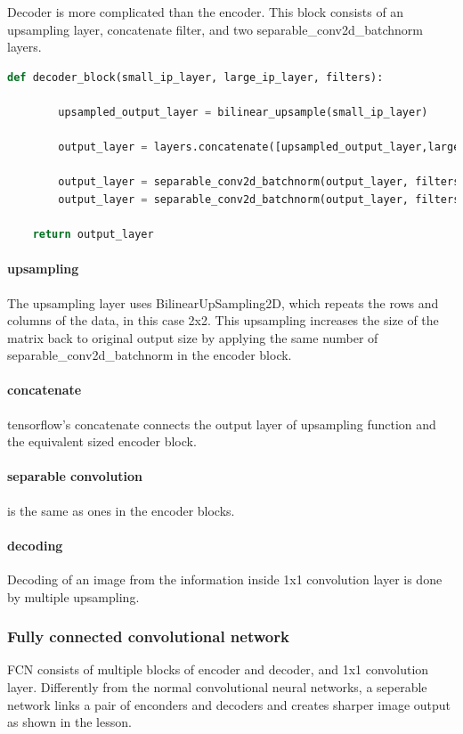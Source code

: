 \documentclass[paper=a4, fontsize=11pt]{scrartcl} %
\numberwithin{equation}{section} %
\numberwithin{figure}{section} %
\numberwithin{table}{section} %
\begin{document}
Decoder is more complicated than the encoder. This block consists of an upsampling layer, concatenate filter, and two separable\_conv2d\_batchnorm layers.
\begin{lstlisting}[language=Python, caption=Decoder block code]
	def decoder_block(small_ip_layer, large_ip_layer, filters):
    
		upsampled_output_layer = bilinear_upsample(small_ip_layer)
		
		output_layer = layers.concatenate([upsampled_output_layer,large_ip_layer])
		
		output_layer = separable_conv2d_batchnorm(output_layer, filters)
		output_layer = separable_conv2d_batchnorm(output_layer, filters)
    
    return output_layer
\end{lstlisting}

\paragraph{upsampling} The upsampling layer uses BilinearUpSampling2D, which repeats the rows and columns of the data, in this case 2x2. This upsampling increases the size of the matrix back to original output size by applying the same number of separable\_conv2d\_batchnorm in the encoder block.
\paragraph{concatenate} tensorflow's concatenate connects the output layer of upsampling function and the equivalent sized encoder block.
\paragraph{separable convolution} is the same as ones in the encoder blocks.
\paragraph{decoding} Decoding of an image from the information inside 1x1 convolution layer is done by multiple upsampling.

\subsubsection{Fully connected convolutional network}
FCN consists of multiple blocks of encoder and decoder, and 1x1 convolution layer. Differently from the normal convolutional neural networks, a seperable network links a pair of enconders and decoders and creates sharper image output as shown in the lesson.
\end{document}
